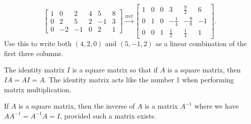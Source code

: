\begin{problem*}[21, revised]
\begin{enumerate}
$$\begin{bmatrix}
1 & 0 & 2 & 4 & 5 & 8 \\
0 & 2 & 5 & 2 & -1 & 3 \\
0 & -2 & -1 & 0 & 2 & 1
\end{bmatrix}
\xrightarrow{\text{rref}}
\begin{bmatrix}
1 & 0 & 0 & 3 & \frac{9}{2} & 6 \\
0 & 1 & 0 & -\frac{1}{4} & -\frac{9}{8} & -1 \\
0 & 0 & 1 & \frac{1}{2} & \frac{1}{4} & 1 
\end{bmatrix}
.$$
Use this to write both $(4,2,0)$ and $(5,-1,2)$ as a linear combination of the first three columns.
\end{enumerate}
 
\end{problem*}

\begin{definition}
 The identity matrix $I$ is a square matrix so that if $A$ is a square matrix, then $IA=AI=A$. The identity matrix acts like the number 1 when performing matrix multiplication.

 If $A$ is a square matrix, then the inverse of $A$ is a matrix $A^{-1}$ where we have $AA^{-1}=A^{-1}A=I$, provided such a matrix exists.
\end{definition}



